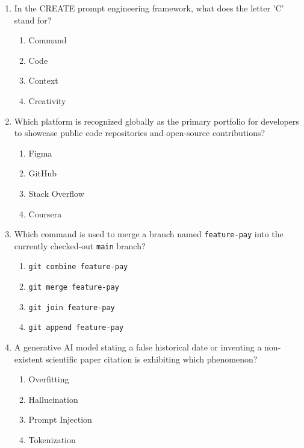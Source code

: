 \begin{enumerate}[leftmargin=1.5em]
    \item In the CREATE prompt engineering framework, what does the letter 'C' stand for?
    \begin{enumerate}[label=(\alph*)]
        \item Command
        \item Code
        \item Context
        \item Creativity
    \end{enumerate}

    \item Which platform is recognized globally as the primary portfolio for developers to showcase public code repositories and open-source contributions?
    \begin{enumerate}[label=(\alph*)]
        \item Figma
        \item GitHub
        \item Stack Overflow
        \item Coursera
    \end{enumerate}

    \item Which command is used to merge a branch named \texttt{feature-pay} into the currently checked-out \texttt{main} branch?
    \begin{enumerate}[label=(\alph*)]
        \item \texttt{git combine feature-pay}
        \item \texttt{git merge feature-pay}
        \item \texttt{git join feature-pay}
        \item \texttt{git append feature-pay}
    \end{enumerate}

    \item A generative AI model stating a false historical date or inventing a non-existent scientific paper citation is exhibiting which phenomenon?
    \begin{enumerate}[label=(\alph*)]
        \item Overfitting
        \item Hallucination
        \item Prompt Injection
        \item Tokenization
    \end{enumerate}
\end{enumerate}

